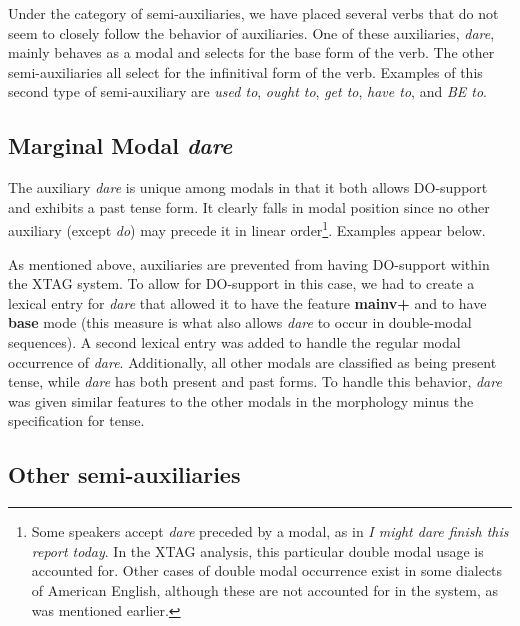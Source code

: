 Under the category of semi-auxiliaries, we have placed several verbs that do 
not seem to closely follow the behavior of auxiliaries.  One of these 
auxiliaries, {\it dare}, mainly behaves as a modal and selects for the base 
form of the verb.  The other semi-auxiliaries all select for the infinitival 
form of the verb.  Examples of this second type of semi-auxiliary are {\it used to}, {\it ought to}, {\it get to}, {\it have to}, and {\it BE to}.  
 
\subsection{Marginal Modal {\it dare}} 
 
The auxiliary {\it dare} is unique among modals in that it both allows 
DO-support and exhibits a past tense form.  It clearly falls in modal position 
since no other auxiliary (except {\it do}) may precede it in linear 
order\footnote{Some speakers accept {\it dare} preceded by a modal, as in {\it I might dare finish this report today}.  In the XTAG analysis, this particular double modal usage is accounted for.  Other cases of double modal occurrence exist in some dialects of American English,  although these are not accounted for in the system, as was mentioned earlier.\label{dare-footnote}}.  Examples appear below. 
 
\beginsentences
{}\label{ex:25} 
\label{ex:26} 
\label{ex:27} 
\label{ex:28} 
\label{ex:29} 
\label{ex:30} 
\endsentences

 
As mentioned above, auxiliaries are prevented from having DO-support within the 
XTAG system.  To allow for DO-support in this case, we had to create a lexical 
entry for {\it dare} that allowed it to have the feature {\bf mainv+} and to have {\bf base} mode (this measure is 
what also allows {\it dare} to occur in double-modal sequences).  A second 
lexical entry was added to handle the regular modal occurrence of {\it dare}. 
Additionally, all other modals are classified as being present tense, while 
{\it dare} has both present and past forms.  To handle this behavior, {\it dare} was given similar features to the other modals in the morphology minus 
the specification for tense. 
 
\subsection{Other semi-auxiliaries} 
 
